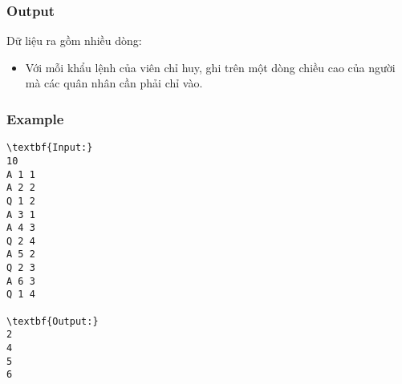 \subsubsection{   Output  }

   Dữ liệu ra gồm nhiều dòng:  
\begin{itemize}
	\item     Với mỗi khẩu lệnh của viên chỉ huy, ghi trên một dòng  chiều cao của người mà các quân nhân cần phải chỉ vào.   
\end{itemize}



\subsubsection{   Example  }
\begin{verbatim}
\textbf{Input:}
10
A 1 1
A 2 2
Q 1 2
A 3 1
A 4 3
Q 2 4
A 5 2
Q 2 3
A 6 3
Q 1 4

\textbf{Output:}
2
4
5
6
\end{verbatim}

